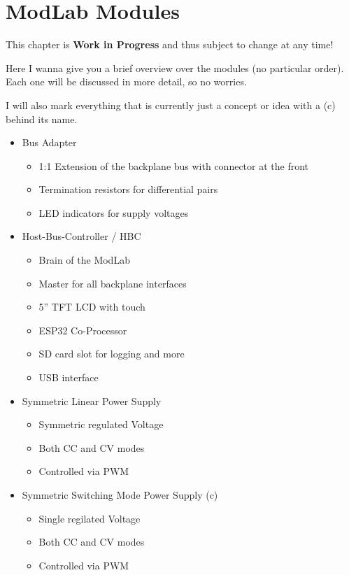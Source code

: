 \chapter{ModLab Modules}
This chapter is \textbf{Work in Progress} and thus subject to change at any time!

Here I wanna give you a brief overview over the modules (no particular order). Each one will be discussed in more detail, so no worries. 

I will also mark everything that is currently just a concept or idea with a (c) behind its name. 

\begin{itemize}
	\item Bus Adapter
	\begin{itemize}
		\item 1:1 Extension of the backplane bus with connector at the front
		\item Termination resistors for differential pairs
		\item LED indicators for supply voltages
	\end{itemize}
	\item Host-Bus-Controller / HBC
	\begin{itemize}
		\item Brain of the ModLab
		\item Master for all backplane interfaces
		\item 5'' TFT LCD with touch
		\item ESP32 Co-Processor
		\item SD card slot for logging and more
		\item USB interface
	\end{itemize}
	\item Symmetric Linear Power Supply
	\begin{itemize}
		\item Symmetric regulated Voltage
		\item Both CC and CV modes
		\item Controlled via PWM
	\end{itemize}
	\item Symmetric Switching Mode Power Supply (c)
	\begin{itemize}
		\item Single regilated Voltage
		\item Both CC and CV modes
		\item Controlled via PWM
	\end{itemize}

\end{itemize}
